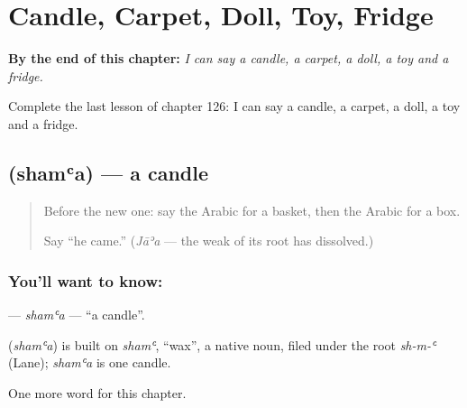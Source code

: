 
\chapter{Candle, Carpet, Doll, Toy, Fridge}
\label{ch:ar-candle-carpet-doll-toy-fridge}

\begin{chapteropening}
\textbf{By the end of this chapter:} \emph{I can say a candle, a carpet, a doll, a toy and a fridge.}

Complete the last lesson of chapter 126: I can say a candle, a carpet, a doll, a toy and a fridge.
\end{chapteropening}

\section[\texorpdfstring{\ar{شمعة} (shamʿa)}{شمعة (shamʿa)}]{ (shamʿa) — a candle}

\label{lesson:AR-C126-shama}



\begin{quote}
Before the new one: say the Arabic for a basket, then the Arabic for a box.

Say \textquotedblleft{}he came.\textquotedblright{} (\emph{Jāʾa} — the weak \textbf{} of its root has dissolved.)
\end{quote}

\subsection*{You'll want to know: }
\textbf{} — \emph{shamʿa} — \textquotedblleft{}a candle\textquotedblright{}.

\begin{cousinweb}
\textbf{} (\emph{shamʿa}) is built on \emph{shamʿ}, \textquotedblleft{}wax\textquotedblright{}, a native noun, filed under the root \emph{sh-m-ʿ} (Lane); \emph{shamʿa} is one candle.
\end{cousinweb}

\begin{grammarlens}[title={What you've built}]
One more word for this chapter.
\end{grammarlens}

